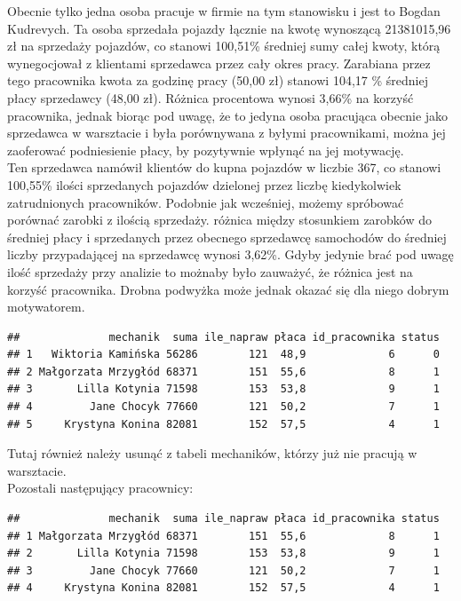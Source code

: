 \documentclass{article}\usepackage[]{graphicx}\usepackage[]{xcolor}
\makeatletter
\newenvironment{kframe}{%
 \def\at@end@of@kframe{}%
 \ifinner\ifhmode%
  \def\at@end@of@kframe{\end{minipage}}%
  \begin{minipage}{\columnwidth}%
 \fi\fi%
 \def\FrameCommand##1{\hskip\@totalleftmargin \hskip-\fboxsep
 \colorbox{shadecolor}{##1}\hskip-\fboxsep
     \hskip-\linewidth \hskip-\@totalleftmargin \hskip\columnwidth}%
 \MakeFramed {\advance\hsize-\width
   \@totalleftmargin\z@ \linewidth\hsize
   \@setminipage}}%
 {\par\unskip\endMakeFramed%
 \at@end@of@kframe}
\newenvironment{knitrout}{}{} %
\makeatother
\begin{document}
Obecnie tylko jedna osoba pracuje w firmie na tym stanowisku i jest to Bogdan Kudrevych. Ta osoba sprzedała pojazdy łącznie na kwotę wynoszącą 21381015,96 zł na sprzedaży pojazdów, co stanowi 100,51\% średniej sumy całej kwoty, którą wynegocjował z klientami sprzedawca przez cały okres pracy. Zarabiana przez tego pracownika kwota za godzinę pracy (50,00 zł) stanowi 104,17 \% średniej płacy sprzedawcy (48,00 zł). Różnica procentowa wynosi 3,66\% na korzyść pracownika, jednak biorąc pod uwagę, że to jedyna osoba pracująca obecnie jako sprzedawca w warsztacie i była porównywana z byłymi pracownikami, można jej zaoferować podniesienie płacy, by pozytywnie wpłynąć na jej motywację. \\

Ten sprzedawca namówił klientów do kupna pojazdów w liczbie 367, co stanowi 100,55\% ilości sprzedanych pojazdów dzielonej przez liczbę kiedykolwiek zatrudnionych pracowników. Podobnie jak wcześniej, możemy spróbować porównać zarobki z ilością sprzedaży. różnica między stosunkiem zarobków do średniej płacy i sprzedanych przez obecnego sprzedawcę samochodów do średniej liczby przypadającej na sprzedawcę  wynosi 3,62\%. Gdyby jedynie brać pod uwagę ilość sprzedaży przy analizie to możnaby było zauważyć, że różnica jest na korzyść pracownika. Drobna podwyżka może jednak okazać się dla niego dobrym motywatorem. 

\begin{knitrout}
\color{fgcolor}\begin{kframe}
\begin{verbatim}
##              mechanik  suma ile_napraw płaca id_pracownika status
## 1   Wiktoria Kamińska 56286        121  48,9             6      0
## 2 Małgorzata Mrzygłód 68371        151  55,6             8      1
## 3       Lilla Kotynia 71598        153  53,8             9      1
## 4         Jane Chocyk 77660        121  50,2             7      1
## 5     Krystyna Konina 82081        152  57,5             4      1
\end{verbatim}
\end{kframe}
\end{knitrout}


Tutaj również należy usunąć z tabeli mechaników, którzy już nie pracują w warsztacie. \\

Pozostali następujący pracownicy:

\begin{knitrout}
\color{fgcolor}\begin{kframe}
\begin{verbatim}
##              mechanik  suma ile_napraw płaca id_pracownika status
## 1 Małgorzata Mrzygłód 68371        151  55,6             8      1
## 2       Lilla Kotynia 71598        153  53,8             9      1
## 3         Jane Chocyk 77660        121  50,2             7      1
## 4     Krystyna Konina 82081        152  57,5             4      1
\end{verbatim}
\end{kframe}
\end{knitrout}
\end{document}
